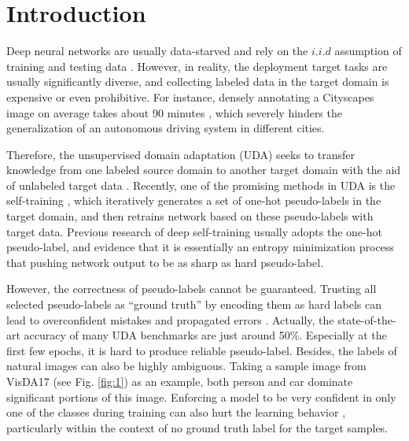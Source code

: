 \documentclass[a4paper,conference]{IEEEtran}
\theoremstyle{plain}%
\begin{document}
\section{Introduction}

Deep neural networks are usually data-starved and rely on the $i.i.d$ assumption of training and testing data \cite{che2019deep,liu2020wasserstein,liu2020unimodal,liu2020importance,liu2020severity,he2020image,han2020wasserstein,liu2020auto3d}. However, in reality, the deployment target tasks are usually significantly diverse, and collecting labeled data in the target domain is expensive or even prohibitive. For instance, densely annotating a Cityscapes image on average takes about 90 minutes \cite{cordts2016cityscapes}, which severely hinders the generalization of an autonomous driving system in different cities. 


Therefore, the unsupervised domain adaptation (UDA) seeks to transfer knowledge from one labeled source domain to another target domain with the aid of unlabeled target data \cite{kouw2018introduction}. Recently, one of the promising methods in UDA is the self-training \cite{lee2013pseudo,zou2019confidence}, which iteratively generates a set of one-hot pseudo-labels in the target domain, and then retrains network based on these pseudo-labels with target data. Previous research of deep self-training usually adopts the one-hot pseudo-label, and evidence that it is essentially an entropy minimization process \cite{lee2013pseudo} that pushing network output to be as sharp as hard pseudo-label. 









However, the correctness of pseudo-labels cannot be guaranteed. Trusting all selected pseudo-labels as “ground truth” by encoding them as hard labels can lead to overconfident mistakes and propagated errors \cite{zou2019confidence}. Actually, the state-of-the-art accuracy of many UDA benchmarks are just around 50\%. Especially at the first few epochs, it is hard to produce reliable pseudo-label. Besides, the labels of natural images can also be highly ambiguous. Taking a sample image from VisDA17 \cite{peng2018visda} (see Fig. \ref{fig:1}) as an example, both person and car dominate significant portions of this image. Enforcing a model to be very confident in only one of the classes during training can also hurt the learning behavior \cite{bagherinezhad2018label}, particularly within the context of no ground truth label for the target samples. 
\end{document}
